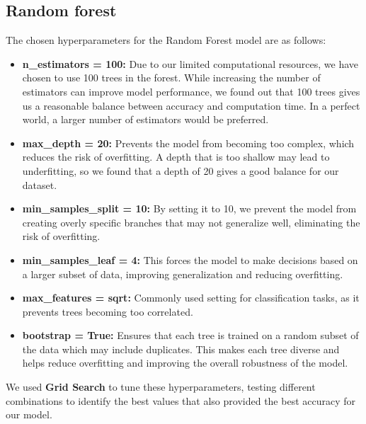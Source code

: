 \subsection{Random forest}
The chosen hyperparameters for the Random Forest model are as follows:

\begin{itemize}
    \item \textbf{n\_estimators = 100:} Due to our limited computational resources, we have chosen to use 100 trees in the forest. While increasing the number of estimators can improve model performance, we found out that 100 trees gives us a reasonable balance between accuracy and computation time. In a perfect world, a larger number of estimators would be preferred.
    
    \item \textbf{max\_depth = 20:} Prevents the model from becoming too complex, which reduces the risk of overfitting. A depth that is too shallow may lead to underfitting, so we found that a depth of 20 gives a good balance for our dataset.
    
    \item \textbf{min\_samples\_split = 10:} By setting it to 10, we prevent the model from creating overly specific branches that may not generalize well, eliminating the risk of overfitting.
    
    \item \textbf{min\_samples\_leaf = 4:} This forces the model to make decisions based on a larger subset of data, improving generalization and reducing overfitting. 
    
    \item \textbf{max\_features = sqrt:} Commonly used setting for classification tasks, as it prevents trees becoming too correlated.
    
    \item \textbf{bootstrap = True:} Ensures that each tree is trained on a random subset of the data which may include duplicates. This makes each tree diverse and helps reduce overfitting and improving the overall robustness of the model.
\end{itemize}

We used \textbf{Grid Search} to tune these hyperparameters, testing different combinations to identify the best values that also provided the best accuracy for our model.
